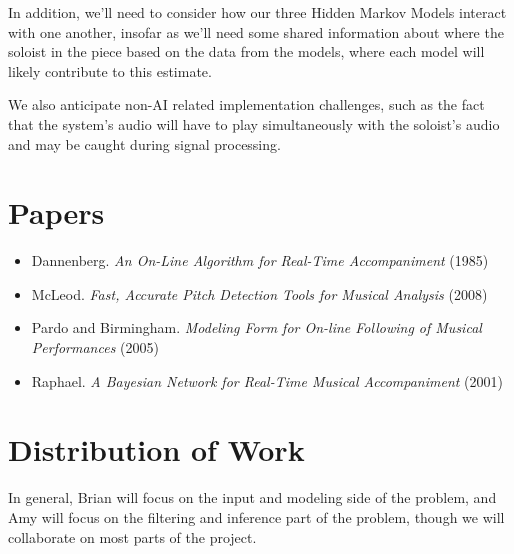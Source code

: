 \documentclass[11pt]{article}
\begin{document}
In addition, we'll need to consider how our three Hidden Markov
Models interact with one another, insofar as we'll need some
shared information about where the soloist in the piece
based on the data from the models, where  each model will
likely contribute to this estimate.

We also anticipate non-AI related implementation challenges,
such as the fact that the system's audio will have to play
simultaneously with the soloist's audio and may be caught
during signal processing.

\section{Papers}

\begin{itemize}
    \item Dannenberg. \textit{An On-Line Algorithm for Real-Time Accompaniment} (1985)
    \item McLeod. \textit{Fast, Accurate Pitch Detection Tools for Musical Analysis} (2008)
    \item Pardo and Birmingham. \textit{Modeling Form for On-line Following of Musical Performances} (2005)
    \item Raphael. \textit{A Bayesian Network for Real-Time Musical Accompaniment} (2001)
\end{itemize}

\section{Distribution of Work}

In general, Brian will focus on the input and modeling side
of the problem, and Amy will focus on the filtering and
inference part of the problem, though we will collaborate
on most parts of the project.
\end{document}

